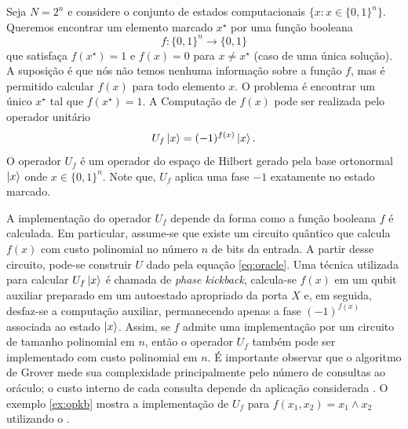 Seja $N=2^n$ e considere o conjunto de estados computacionais $\{x: x\in\{0,1\}^n\}$.
Queremos encontrar um elemento marcado $x^\star$ por uma função booleana
$$
f:\{0,1\}^n \to \{0,1\}
$$
que satisfaça $f(x^\star)=1$ e $f(x)=0$ para $x \neq x^\star$ (caso de uma única solução). A suposição é que nós não temos nenhuma informação sobre a função $f$, mas é permitido calcular $f(x)$ para todo elemento $x$. O problema é encontrar um único $x^\star$ tal que $f(x^\star)=1$. A Computação de $f(x)$ pode ser realizada pelo operador unitário
\begin{equation}\label{eq:oracle}
U_f \ket{x} = (-1)^{f(x)}\ket{x}.
\end{equation}
O operador $U_f$ é um operador do espaço de Hilbert gerado pela base ortonormal $\ket{x}$ onde $x \in \{0,1\}^n$. Note que, $U_f$  aplica uma fase $-1$ exatamente no estado marcado.

A implementação do operador $U_f$ depende da forma como a função booleana $f$ é calculada. Em particular, assume-se que existe um circuito quântico que calcula $f(x)$ com custo polinomial no número $n$ de bits da entrada. A partir desse circuito, pode-se construir $U$ dado pela equação \eqref{eq:oracle}. Uma técnica utilizada para calcular $U_f\ket{x}$ é chamada de \textit{phase kickback}, calcula-se $f(x)$ em um qubit auxiliar preparado em um autoestado apropriado da porta $X$ e, em seguida, desfaz-se a computação auxiliar, permanecendo apenas a fase $(-1)^{f(x)}$ associada ao estado $\ket{x}$. Assim, se $f$ admite uma implementação por um circuito de tamanho polinomial em $n$, então o operador $U_f$ também pode ser implementado com custo polinomial em $n$. É importante observar que o algoritmo de Grover mede sua complexidade principalmente pelo número de consultas ao oráculo; o custo interno de cada consulta depende da aplicação considerada \cite[Seção~6.1.2]{nielsen2010quantum}. O exemplo \ref{ex:opkb} mostra a implementação de $U_f$ para $f(x_1,x_2)=x_1\wedge x_2$ utilizando o .

